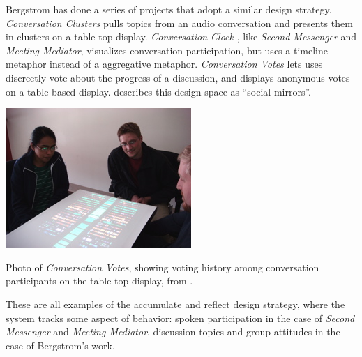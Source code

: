 Bergstrom has done a series of projects that adopt a similar design strategy. \emph{Conversation Clusters} \citep{Bergstrom:2009fe} pulls topics from an audio conversation and presents them in clusters on a table-top display. \emph{Conversation Clock} \citep{Bergstrom:2007je}, like \emph{Second Messenger} and \emph{Meeting Mediator}, visualizes conversation participation, but uses a timeline metaphor instead of a aggregative metaphor. \emph{Conversation Votes} \citep{Bergstrom:2009ej} lets uses discreetly vote about the progress of a discussion, and displays anonymous votes on a table-based display. \citet{Karahalios:hu} describes this design space as ``social mirrors''. 

\begin{marginfigure}
	\includegraphics{figures/conversation_votes.jpg}
	\caption{Photo of \emph{Conversation Votes}, showing voting history among conversation participants on the table-top display, from \citep{Bergstrom:2009ej}.}
	\label{fig:conversation-votes}
\end{marginfigure}




These are all examples of the accumulate and reflect design strategy, where the system tracks some aspect of behavior: spoken participation in the case of \emph{Second Messenger} and \emph{Meeting Mediator}, discussion topics and group attitudes in the case of Bergstrom's work. 




